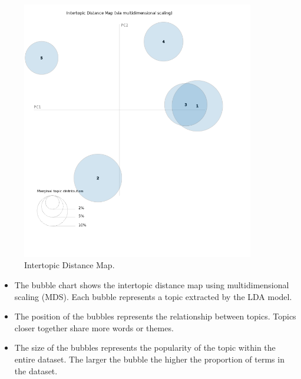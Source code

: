 \begin{center}
\begin{figure}[H]
  \centering
  \includegraphics[width=4in]{img/topics/png/topics.png}
  \caption{Intertopic Distance Map.}
  \label{Figure:intertopicdistancemap}
\end{figure}
\end{center}

\begin{itemize}
  \item The bubble chart shows the intertopic distance map using
    multidimensional scaling (MDS). Each bubble represents a topic extracted by
    the LDA model.
  \item The position of the bubbles represents the relationship between topics.
    Topics closer together share more words or themes.
  \item The size of the bubbles represents the popularity of the topic within
    the entire dataset. The larger the bubble the higher the proportion of
    terms in the dataset.
\end{itemize}



